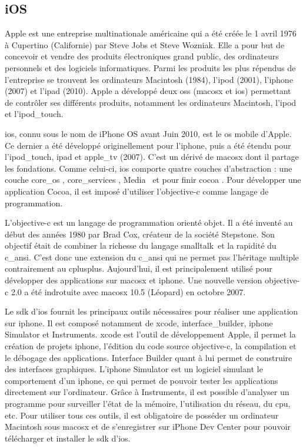 \subsection{iOS}
	Apple est une entreprise multinationale américaine qui a été créée le 1
	avril 1976 à Cupertino (Californie) par Steve Jobs et Steve Wozniak. Elle a
	pour but de concevoir et vendre des produits électroniques grand public, des
	ordinateurs personnels et des logiciels informatiques. Parmi les produits les
	plus répendus de l'entreprise se trouvent les ordinateurs Macintosh (1984),
	l'\gls{ipod} (2001), l'\gls{iphone} (2007) et l'\gls{ipad} (2010). Apple a
	développé deux \glspl{os} (\gls{macosx} et \gls{ios})
	permettant de contrôler ses différents produits, notamment les ordinateurs 
	Macintosh, l'\gls{ipod} et l'\gls{ipod_touch}.
			
	\gls{ios}, connu sous le nom de iPhone OS avant Juin 2010, est le \gls{os} 
	mobile d'Apple. Ce dernier a été développé originellement pour l'\gls{iphone}, puis a été étendu pour l'\gls{ipod_touch}, \gls{ipad} et
	\gls{apple_tv} (2007). C'est un dérivé de \gls{macosx}  dont il partage les 
	fondations. Comme celui-ci, \gls{ios} comporte quatre couches d'abstraction : une
	couche \og \gls{core_os} \fg, \og \gls{core_services} \fg, \og Media \fg \, et pour finir \og \gls{cocoa} \fg. Pour
	développer une application Cocoa, il est imposé d'utiliser l'\gls{objective-c} comme
	langage de programmation.
			
	L'\gls{objective-c} est un langage de programmation orienté objet. Il a été inventé
	au début des années 1980 par Brad Cox, créateur de la société Stepstone. Son
	objectif était de combiner la richesse du langage \gls{smalltalk}\, et la
	rapidité du \gls{c_ansi}. 
	C'est  donc une extension du \gls{c_ansi} qui ne permet pas l'héritage multiple
	contrairement au \gls{cplusplus}. Aujourd'hui, il est principalement utilisé
	pour développer des applications sur \gls{macosx} et \gls{iphone}. Une nouvelle version
	\gls{objective-c} 2.0 a été indrotuite avec \gls{macosx} 10.5 (Léopard) en octobre 2007.
			
	Le \gls{sdk} d'\gls{ios} fournit les principaux outils nécessaires pour
	réaliser une application sur \gls{iphone}. Il est composé notamment de \gls{xcode},
	\gls{interface_builder}, \gls{iphone} Simulator et Instruments. \gls{xcode} est l'outil de
	développement Apple, il permet la création de projets \gls{iphone}, l’édition du code
	source \gls{objective-c}, la compilation et le débogage des applications. Interface
	Builder quant à lui permet de construire des interfaces graphiques. L'\gls{iphone}
	Simulator est un logiciel simulant le comportement d'un \gls{iphone}, ce qui 
	permet de pouvoir tester les applications directement sur l'ordinateur. Grâce
	à Instruments, il est possible d'analyser un programme pour surveiller l’état de la
	mémoire, l’utilisation du réseau, du \gls{cpu}, etc. Pour utiliser tous ces outils,
	il est obligatoire de posséder un ordinateur Macintosh sous \gls{macosx} et de
	s'enregistrer sur iPhone Dev Center pour pouvoir télécharger et installer le
	\gls{sdk} d'\gls{ios}.

